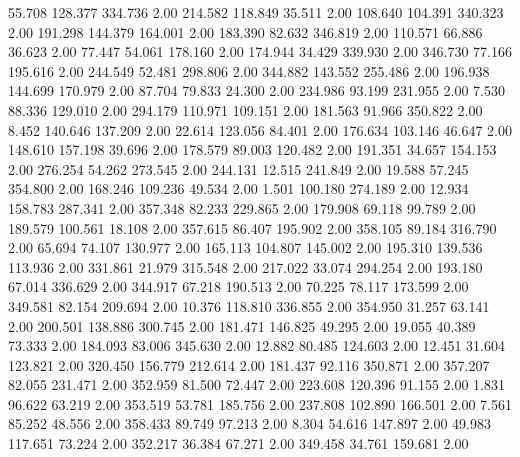   55.708  128.377  334.736         2.00
 214.582  118.849   35.511         2.00
 108.640  104.391  340.323         2.00
 191.298  144.379  164.001         2.00
 183.390   82.632  346.819         2.00
 110.571   66.886   36.623         2.00
  77.447   54.061  178.160         2.00
 174.944   34.429  339.930         2.00
 346.730   77.166  195.616         2.00
 244.549   52.481  298.806         2.00
 344.882  143.552  255.486         2.00
 196.938  144.699  170.979         2.00
  87.704   79.833   24.300         2.00
 234.986   93.199  231.955         2.00
   7.530   88.336  129.010         2.00
 294.179  110.971  109.151         2.00
 181.563   91.966  350.822         2.00
   8.452  140.646  137.209         2.00
  22.614  123.056   84.401         2.00
 176.634  103.146   46.647         2.00
 148.610  157.198   39.696         2.00
 178.579   89.003  120.482         2.00
 191.351   34.657  154.153         2.00
 276.254   54.262  273.545         2.00
 244.131   12.515  241.849         2.00
  19.588   57.245  354.800         2.00
 168.246  109.236   49.534         2.00
   1.501  100.180  274.189         2.00
  12.934  158.783  287.341         2.00
 357.348   82.233  229.865         2.00
 179.908   69.118   99.789         2.00
 189.579  100.561   18.108         2.00
 357.615   86.407  195.902         2.00
 358.105   89.184  316.790         2.00
  65.694   74.107  130.977         2.00
 165.113  104.807  145.002         2.00
 195.310  139.536  113.936         2.00
 331.861   21.979  315.548         2.00
 217.022   33.074  294.254         2.00
 193.180   67.014  336.629         2.00
 344.917   67.218  190.513         2.00
  70.225   78.117  173.599         2.00
 349.581   82.154  209.694         2.00
  10.376  118.810  336.855         2.00
 354.950   31.257   63.141         2.00
 200.501  138.886  300.745         2.00
 181.471  146.825   49.295         2.00
  19.055   40.389   73.333         2.00
 184.093   83.006  345.630         2.00
  12.882   80.485  124.603         2.00
  12.451   31.604  123.821         2.00
 320.450  156.779  212.614         2.00
 181.437   92.116  350.871         2.00
 357.207   82.055  231.471         2.00
 352.959   81.500   72.447         2.00
 223.608  120.396   91.155         2.00
   1.831   96.622   63.219         2.00
 353.519   53.781  185.756         2.00
 237.808  102.890  166.501         2.00
   7.561   85.252   48.556         2.00
 358.433   89.749   97.213         2.00
   8.304   54.616  147.897         2.00
  49.983  117.651   73.224         2.00
 352.217   36.384   67.271         2.00
 349.458   34.761  159.681         2.00
